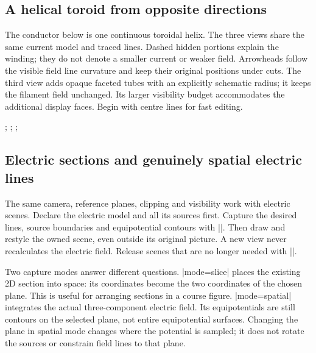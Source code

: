 \subsection{A helical toroid from opposite directions}
The conductor below is one continuous toroidal helix. The three views share the
same current model and traced lines. Dashed hidden portions explain the winding;
they do not denote a smaller current or weaker field. Arrowheads follow the
visible field line curvature and keep their original positions under cuts.
The third view adds opaque faceted tubes with an explicitly schematic radius;
it keeps the filament field unchanged. Its larger visibility budget accommodates
the additional display faces. Begin with centre lines for fast editing.
\begin{codeexample}[width=0pt]
\begingroup
\tikzpicture[femm/biot,
 femm/biot view={seeds={1.6/0/0;1.6/0/.22},
 step=.14,maximum length=11,geometry samples=32}]
 \femmbiotsource[kind=toroid,winding=helix,current=2,
  major radius=1.6,radius=.5,turns=10]
 \femmbiotscene[name=helical-ring]
\endtikzpicture
{}
 ;
\endtikzpicture
\quad
\tikzpicture[ring view,femm/view 3d={azimuth=135}]
 ;
\endtikzpicture
\quad
\tikzpicture[ring view,femm/view 3d={conductors=tube,
 tube radius=schematic,tube size=.035,tube sides=6,
 visibility budget=5000000}]
 ;
\endtikzpicture
{}
\endgroup
\end{codeexample}

\subsection{Electric sections and genuinely spatial electric lines}
\label{sec:electric-scenes}
The same camera, reference planes, clipping and visibility work with electric
scenes. Declare the electric model and all its sources first. Capture the desired
lines, source boundaries and equipotential contours with |\femmelectricscene|.
Then draw and restyle the owned scene, even outside its original picture.
A new view never recalculates the electric field. Release scenes that are no
longer needed with |\femmviewclear|.

Two capture modes answer different questions. |mode=slice| places the existing
2D section into space: its coordinates become the two coordinates of the chosen
plane. This is useful for arranging sections in a course figure. |mode=spatial|
integrates the actual three-component electric field. Its equipotentials are
still contours on the selected plane, not entire equipotential surfaces.
Changing the plane in spatial mode changes where the potential is sampled;
it does not rotate the sources or constrain field lines to that plane.

